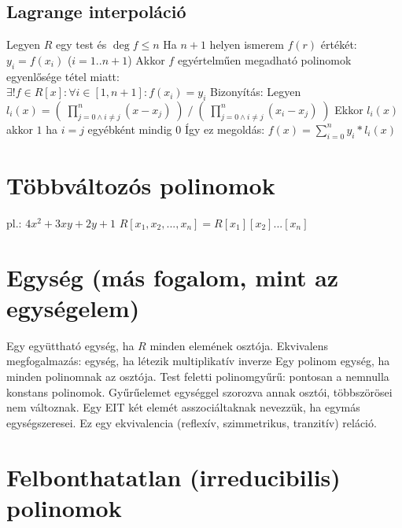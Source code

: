 \documentclass[12pt,a4paper]{article}
\begin{document}
\pagebreak

\subsection{Lagrange interpoláció}

\begin{outline}
	\1 Legyen $R$ egy test és $\deg f \le n$
	\1 Ha $n+1$ helyen ismerem $f(r)$ értékét: $y_i=f(x_i)$ \;\; ($i=1..n+1$)
	\1 Akkor $f$ egyértelműen megadható polinomok egyenlősége tétel miatt:\\
	$\exists! f \in R[x]: \forall i \in [1,n+1]: f(x_i) = y_i$
	\1 Bizonyítás:
		\2 Legyen $l_i(x) = (\; \prod_{j=0 \wedge i \ne j}^{n} (x-x_j) \;) \;/\;
		(\; \prod_{j=0 \wedge i \ne j}^{n} (x_i-x_j) \;)$
		\2 Ekkor $l_i(x)$ akkor $1$ ha $i=j$ egyébként mindig $0$
		\2 Így ez megoldás: $f(x) = \sum_{i=0}^{n} y_i*l_i(x)$
\end{outline}

\section{Többváltozós polinomok}

\begin{outline}
	\1 pl.: $4x^2+3xy+2y+1$
	\1 $R[x_1,x_2,...,x_n] = R[x_1][x_2]...[x_n]$ 
\end{outline}

\section{Egység (más fogalom, mint az egységelem)}

\begin{outline}
	\1 Egy együttható egység, ha $R$ minden elemének osztója.
		\2 Ekvivalens megfogalmazás: egység, ha létezik multiplikatív inverze
	\1 Egy polinom egység, ha minden polinomnak az osztója.
		\2 Test feletti polinomgyűrű: pontosan a nemnulla konstans polinomok.
	\1 Gyűrűelemet egységgel szorozva annak osztói, többszörösei nem változnak.
	\1 Egy EIT két elemét asszociáltaknak nevezzük, ha egymás egységszeresei.
		\2 Ez egy ekvivalencia (reflexív, szimmetrikus, tranzitív) reláció.
\end{outline}

\pagebreak

\section{Felbonthatatlan (irreducibilis) polinomok}
\end{document}
